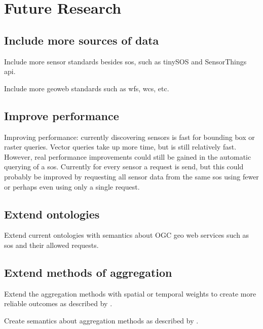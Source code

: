 
\chapter{Future Research}
\label{chap:futureResearch}

\section*{Include more sources of data}
Include more sensor standards besides \ac{sos}, such as tinySOS and SensorThings \ac{api}.

Include more geoweb standards such as \ac{wfs}, \ac{wcs}, etc.

\section*{Improve performance}
Improving performance: currently discovering sensors is fast for bounding box or raster queries. Vector queries take up more time, but is still relatively fast. However, real performance improvements could still be gained in the automatic querying of a \ac{sos}. Currently for every sensor a request is send, but this could probably be improved by requesting all sensor data from the same \ac{sos} using fewer or perhaps even using only a single request.  

\section*{Extend ontologies}
Extend current ontologies with semantics about OGC geo web services such as \ac{sos} and their allowed requests. 

\section*{Extend methods of aggregation}
\label{par:FRaggregation}

Extend the aggregation methods with spatial or temporal weights to create more reliable outcomes as described by \cite{SW:Ganesan}. 

Create semantics about aggregation methods as described by \cite{SSW:Stasch4}. 


